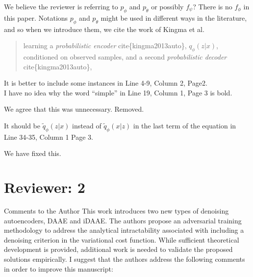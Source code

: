 \documentclass{article}
\begin{document}
We believe the reviewer is referring to $p_\phi$ and $p_\theta$ or possibly $f_\psi$? There is no $f_\phi$ in this paper. Notations $p_\phi$ and $p_\theta$ might be used in different ways in the literature, and so when we introduce them, we cite the work of Kingma et al.\\

\begin{quote}
    learning a \textit{probabilistic encoder} cite\{kingma2013auto\}, $q_\phi(z|x)$, conditioned on observed samples, and a second \textit{probabilistic decoder} cite\{kingma2013auto\},
\end{quote} 

{\color{blue}
It is better to include some instances in Line 4-9, Column 2, Page2.}\\

{\color{blue}
I have no idea why the word “simple” in Line 19, Column 1, Page 3 is bold.}\newline

We agree that this was unnecessary.  Removed.

{\color{blue}
It should be $\tilde q_\phi(z|x)$ instead of $\tilde q_\phi(x|z)$ in the last term of the equation in Line 34-35, Column 1 Page 3. }

We have fixed this.


\section{Reviewer: 2}

Comments to the Author
{\color{blue}
This work introduces two new types of denoising autoencoders, DAAE and iDAAE. The authors propose an adversarial training methodology to address the analytical intractability associated with including a denoising criterion in the variational cost function. While sufficient theoretical development is provided, additional work is needed to validate the proposed solutions empirically. I suggest that the authors address the following comments in order to improve this manuscript:}\newline
\end{document}
